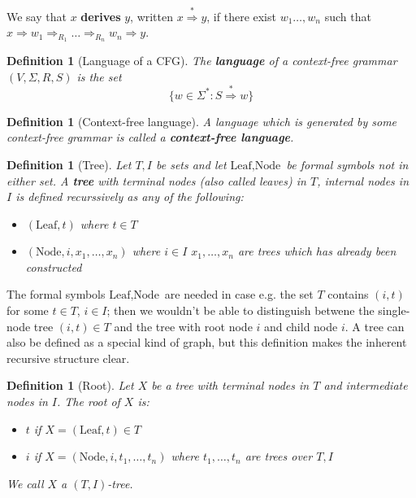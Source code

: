 \documentclass{article}
\theoremstyle{break}
\newtheorem{definition}[theorem]{Definition}
\newcommand{\derives}{{\stackrel{\ast}{\Rightarrow}}}
\begin{document}
We say that $x$ \textbf{derives} $y$, written $x \derives y$, if there exist $w_1 \ldots, w_n$ such that $x \Rightarrow w_1 \Rightarrow_{R_1} \ldots \Rightarrow_{R_n} w_n \Rightarrow y$.

\begin{definition}[Language of a CFG]
\label{def:cfg-language}
The \textbf{language} of a context-free grammar $(V, \Sigma, R, S)$ is the set
\[\{w \in \Sigma^*: S \derives w\}\]
\end{definition}

\begin{definition}[Context-free language]
\label{def:context-free-language}
A language which is generated by some context-free grammar is called a \textbf{context-free language}.
\end{definition}

\begin{definition}[Tree]
\label{def:tree}
Let $T, I$ be sets and let $\textrm{Leaf}, \textrm{Node}$ be formal symbols not in either set. 
A \textbf{tree} with \textit{terminal nodes} (also called \textit{leaves}) in $T$, \textit{internal nodes} in $I$ is defined recurssively as any of the following:
\begin{itemize}
  \item $(\textrm{Leaf}, t)$ where $t\in T$
  \item $(\textrm{Node}, i, x_1, \ldots, x_n)$ where $i \in I$ $x_1, \ldots, x_n$ are trees which has already been constructed
\end{itemize}
\end{definition}

The formal symbols $\textrm{Leaf}, \textrm{Node}$ are needed in case e.g. the set $T$ contains $(i, t)$ for some $t\in T$, $i\in I$; then we wouldn't be able to distinguish betwene the single-node tree $(i,t) \in T$ and the tree with root node $i$ and child node $i$.
A tree can also be defined as a special kind of graph, but this definition makes the inherent recursive structure clear.

\begin{definition}[Root]
\label{def:tree-root}
Let $X$ be a tree with terminal nodes in $T$ and intermediate nodes in $I$.
The root of $X$ is:
\begin{itemize}
  \item $t$ if $X = (\textrm{Leaf}, t) \in T$
  \item $i$ if $X = (\textrm{Node}, i, t_1, \ldots, t_n)$ where $t_1, \ldots, t_n$ are trees over $T, I$
\end{itemize}
We call $X$ a $(T, I)$-tree.
\end{definition}
\end{document}
